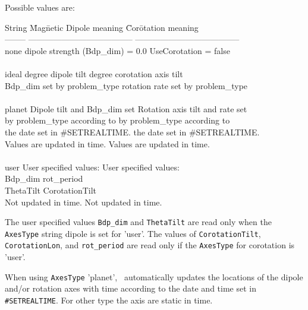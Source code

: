 Possible values are:
\begin{tabbing}
String   \hspace{0.25in} \= Mag\=netic Dipole meaning  \hspace{1.0in} \= Cor\=otation meaning\\
--------                 \>  --------------------------------------  
                       \> \> --------------------------------------\\
none     \> dipole strength (Bdp\_dim) = 0.0  \> \> UseCorotation = false\\
\\
ideal     degree dipole tilt            \>  degree corotation axis tilt\\
         \> Bdp\_dim set by problem\_type      \>  \> rotation rate set by problem\_type\\
\\
planet   \> Dipole tilt and Bdp\_dim set     \> \> Rotation axis tilt and rate set\\
         \>   \>by problem\_type according to  \>   \>by problem\_type according to\\
         \>   \>the date set in \#SETREALTIME. \>   \>the date set in \#SETREALTIME.\\
         \> Values are updated in time.     \> \> Values are updated in time.\\
\\	   				         
user     \> User specified values:            \> \> User specified values:\\
         \>   \>Bdp\_dim                       \>   \> rot\_period \\
         \>   \>ThetaTilt                     \>   \> CorotationTilt \\
         \> Not updated in time.              \> \> Not updated in time.
\end{tabbing}

The user specified values {\tt Bdp\_dim} and {\tt ThetaTilt} are read only when
the {\tt AxesType} string dipole is set for 'user'.  The values of {\tt CorotationTilt},
{\tt CorotationLon}, and {\tt rot\_period} are read only if the {\tt AxesType} 
for corotation is 'user'.  

When using {\tt AxesType} 'planet', \BATSRUS\ automatically updates the locations
of the dipole and/or rotation axes with time according to the date and time set
in {\tt \#SETREALTIME}.  For other type the axis are static in time.
\ \ \\


